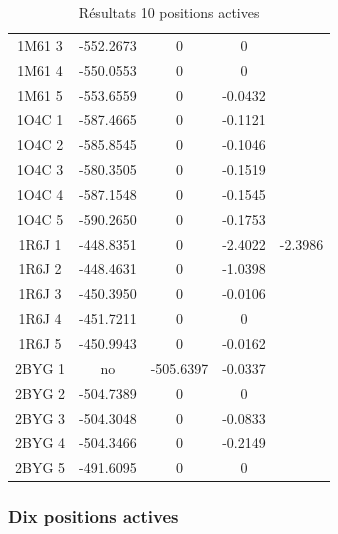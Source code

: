 \documentclass[a4paper,12pt]{article}
\begin{document}
\begin{table}[h]
\begin{tabular}{|c|c|c|c|c|}
        1M61 3 & -552.2673 & 0 & 0 & \\
        1M61 4 & -550.0553 & 0 & 0 & \\
        1M61 5 & -553.6559 & 0 & -0.0432 & \\
        1O4C 1 & -587.4665 & 0 & -0.1121 & \\
        1O4C 2 & -585.8545 & 0 & -0.1046 & \\
        1O4C 3 & -580.3505 & 0 & -0.1519 & \\
        1O4C 4 & -587.1548 & 0 & -0.1545 & \\
        1O4C 5 & -590.2650 & 0 & -0.1753 & \\
        1R6J 1 & -448.8351 & 0 & -2.4022 & -2.3986 \\
        1R6J 2 & -448.4631 & 0 & -1.0398 & \\
        1R6J 3 & -450.3950 & 0 & -0.0106 & \\
        1R6J 4 & -451.7211 & 0 & 0 & \\
        1R6J 5 & -450.9943 & 0 & -0.0162 & \\
        2BYG 1 & no & -505.6397 & -0.0337 & \\
        2BYG 2 & -504.7389 & 0 & 0 & \\
        2BYG 3 & -504.3048 & 0 & -0.0833 & \\
        2BYG 4 & -504.3466 & 0 & -0.2149 & \\
        2BYG 5 & -491.6095 & 0 & 0 & \\
        
        \hline


 \end{tabular}      
 \caption{Résultats 10 positions actives }
 \label{tab_echec2BYG__1}      
\end{table}

   \subsubsection{ Dix positions actives}
\end{document}
